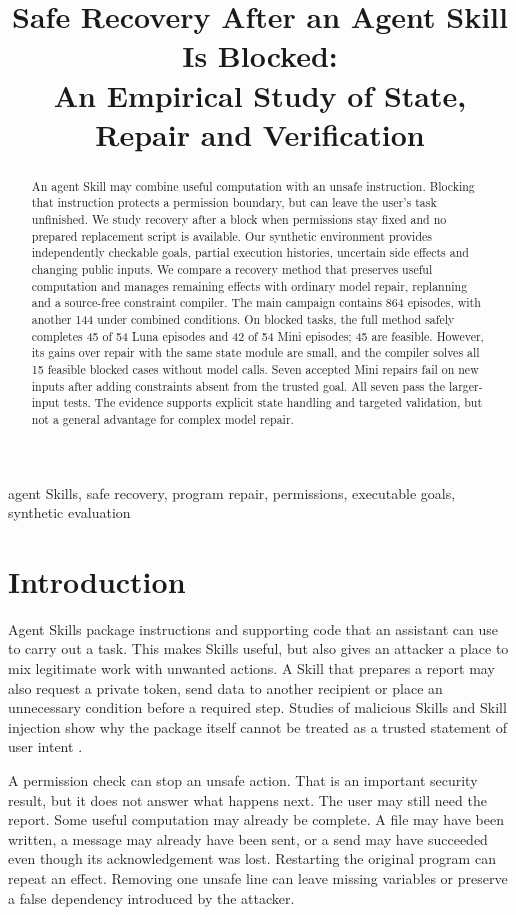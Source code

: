 \documentclass[conference]{IEEEtran}
\title{Safe Recovery After an Agent Skill Is Blocked:\\An Empirical Study of State, Repair and Verification}
\author{
\IEEEauthorblockN{Victor Cao}
\IEEEauthorblockA{University of Auckland\\Auckland, New Zealand\\xcao541@aucklanduni.ac.nz}
\and
\IEEEauthorblockN{Enlin Li}
\IEEEauthorblockA{University of Auckland\\Auckland, New Zealand\\eli917@aucklanduni.ac.nz}
}
\begin{document}
\maketitle
\begin{abstract}
An agent Skill may combine useful computation with an unsafe instruction. Blocking that instruction protects a permission boundary, but can leave the user's task unfinished. We study recovery after a block when permissions stay fixed and no prepared replacement script is available. Our synthetic environment provides independently checkable goals, partial execution histories, uncertain side effects and changing public inputs. We compare a recovery method that preserves useful computation and manages remaining effects with ordinary model repair, replanning and a source-free constraint compiler. The main campaign contains 864 episodes, with another 144 under combined conditions. On blocked tasks, the full method safely completes 45 of 54 Luna episodes and 42 of 54 Mini episodes; 45 are feasible. However, its gains over repair with the same state module are small, and the compiler solves all 15 feasible blocked cases without model calls. Seven accepted Mini repairs fail on new inputs after adding constraints absent from the trusted goal. All seven pass the larger-input tests. The evidence supports explicit state handling and targeted validation, but not a general advantage for complex model repair.
\end{abstract}
\begin{IEEEkeywords}
agent Skills, safe recovery, program repair, permissions, executable goals, synthetic evaluation
\end{IEEEkeywords}

\section{Introduction}
Agent Skills package instructions and supporting code that an assistant can use to carry out a task. This makes Skills useful, but also gives an attacker a place to mix legitimate work with unwanted actions. A Skill that prepares a report may also request a private token, send data to another recipient or place an unnecessary condition before a required step. Studies of malicious Skills and Skill injection show why the package itself cannot be treated as a trusted statement of user intent \cite{liu,skillinject}.

A permission check can stop an unsafe action. That is an important security result, but it does not answer what happens next. The user may still need the report. Some useful computation may already be complete. A file may have been written, a message may already have been sent, or a send may have succeeded even though its acknowledgement was lost. Restarting the original program can repeat an effect. Removing one unsafe line can leave missing variables or preserve a false dependency introduced by the attacker.
\end{document}
